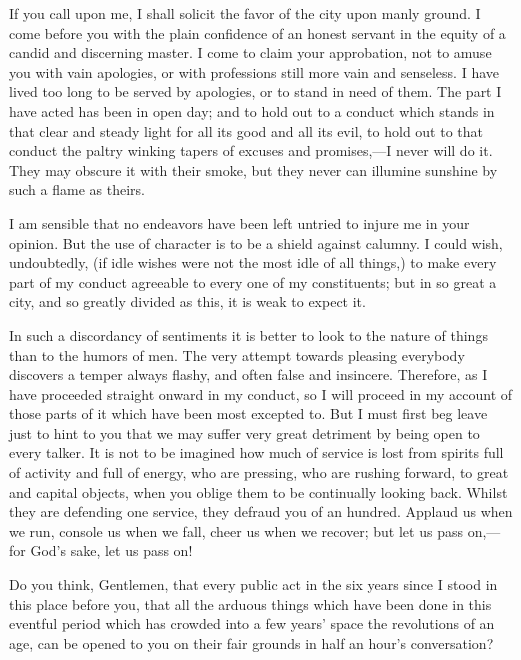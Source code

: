 If you call upon me, I shall solicit the favor of the city upon manly ground. I come before you with the plain confidence of an honest servant in the equity of a candid and discerning master. I come to claim your approbation, not to amuse you with vain apologies, or with professions still more vain and senseless. I have lived too long to be served by apologies, or to stand in need of them. The part I have acted has been in open day; and to hold out to a conduct which stands in that clear and steady light for all its good and all its evil, to hold out to that conduct the paltry winking tapers of excuses and promises,—I never will do it. They may obscure it with their smoke, but they never can illumine sunshine by such a flame as theirs.

I am sensible that no endeavors have been left untried to injure me in your opinion. But the use of character is to be a shield against calumny. I could wish, undoubtedly, (if idle wishes were not the most idle of all things,) to make every part of my conduct agreeable to every one of my constituents; but in so great a city, and so greatly divided as this, it is weak to expect it.

In such a discordancy of sentiments it is better to look to the nature of things than to the humors of men. The very attempt towards pleasing everybody discovers a temper always flashy, and often false and insincere. Therefore, as I have proceeded straight onward in my conduct, so I will proceed in my account of those parts of it which have been most excepted to. But I must first beg leave just to hint to you that we may suffer very great detriment by being open to every talker. It is not to be imagined how much of service is lost from spirits full of activity and full of energy, who are pressing, who are rushing forward, to great and capital objects, when you oblige them to be continually looking back. Whilst they are defending one service, they defraud you of an hundred. Applaud us when we run, console us when we fall, cheer us when we recover; but let us pass on,—for God's sake, let us pass on!

Do you think, Gentlemen, that every public act in the six years since I stood in this place before you, that all the arduous things which have been done in this eventful period which has crowded into a few years' space the revolutions of an age, can be opened to you on their fair grounds in half an hour's conversation?

